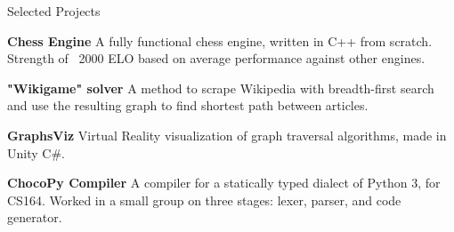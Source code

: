 \documentclass{resume}
\newcommand{\tab}[1]{\hspace{.2667\textwidth}\rlap{#1}}
\newcommand{\itab}[1]{\hspace{0em}\rlap{#1}}
\begin{document}

\begin{rSection}{Selected Projects} \itemsep -2pt
\item \textbf{Chess Engine} A fully functional chess engine, written in C++ from scratch. Strength of ~2000 ELO based on average performance against other engines.
\item \textbf{"Wikigame" solver} A method to scrape Wikipedia with breadth-first search and use the resulting graph to find shortest path between articles.
\item \textbf{GraphsViz} Virtual Reality visualization of graph traversal algorithms, made in Unity C\#.
\item \textbf{ChocoPy Compiler} A compiler for a statically typed dialect of Python 3, for CS164. Worked in a small group on three stages: lexer, parser, and code generator.


\end{rSection}

\end{document}
